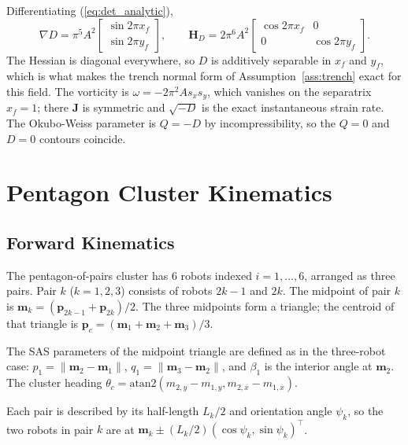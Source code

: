 \documentclass[lettersize,journal]{IEEEtran}
\begin{document}
Differentiating (\ref{eq:det_analytic}),
\begin{equation}
    \nabla D = \pi^5 A^2
    \begin{bmatrix} \sin 2\pi x_f \\ \sin 2\pi y_f \end{bmatrix},
    \qquad
    \mathbf{H}_D = 2\pi^6 A^2
    \begin{bmatrix} \cos 2\pi x_f & 0 \\ 0 & \cos 2\pi y_f \end{bmatrix}.
    \label{eq:gradhess_analytic}
\end{equation}
The Hessian is diagonal everywhere, so $D$ is additively separable in
$x_f$ and $y_f$, which is what makes the trench normal form of
Assumption~\ref{ass:trench} exact for this field. The vorticity is
$\omega = -2\pi^2 A s_x s_y$, which vanishes on the separatrix
$x_f = 1$; there $\mathbf{J}$ is symmetric and $\sqrt{-D}$ is the
exact instantaneous strain rate. The Okubo-Weiss parameter is
$Q = -D$ by incompressibility, so the $Q = 0$ and $D = 0$ contours
coincide.


\section{Pentagon Cluster Kinematics}
\label{app:kinematics}

\subsection{Forward Kinematics}

The pentagon-of-pairs cluster has 6 robots indexed $i = 1, \ldots, 6$, arranged
as three pairs. Pair $k$ ($k = 1, 2, 3$) consists of robots $2k-1$ and $2k$.
The midpoint of pair $k$ is $\mathbf{m}_k = (\mathbf{p}_{2k-1} +
\mathbf{p}_{2k})/2$. The three midpoints form a triangle; the centroid of that
triangle is $\mathbf{p}_c = (\mathbf{m}_1 + \mathbf{m}_2 + \mathbf{m}_3)/3$.

The SAS parameters of the midpoint triangle are defined as in the three-robot
case: $p_1 = \|\mathbf{m}_2 - \mathbf{m}_1\|$, $q_1 = \|\mathbf{m}_3 -
\mathbf{m}_2\|$, and $\beta_1$ is the interior angle at $\mathbf{m}_2$.
The cluster heading $\theta_c = \text{atan2}(m_{2,y} - m_{1,y},
m_{2,x} - m_{1,x})$.

Each pair is described by its half-length $L_k/2$ and orientation angle
$\psi_k$, so the two robots in pair $k$ are at $\mathbf{m}_k \pm (L_k/2)
(\cos\psi_k, \sin\psi_k)^\top$.
\end{document}
